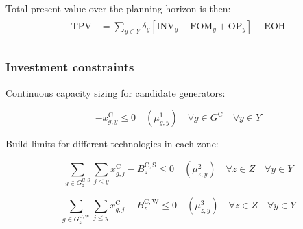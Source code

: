 \documentclass{article}
\newcommand{\sGeneratorsCandidate}{G^{\mathrm{C}}}
\newcommand{\sGeneratorsCandidateWind}{G^{\mathrm{C,W}}}
\newcommand{\sGeneratorsCandidateSolar}{G^{\mathrm{C,S}}}
\newcommand{\sYears}{Y}
\newcommand{\sZones}{Z}
\newcommand{\iGenerator}{g}
\newcommand{\iYear}{y}
\newcommand{\iYearAlias}{j}
\newcommand{\iScenario}{s}
\newcommand{\iZone}{z}
\newcommand{\cOperatingCost}[1][\iYear,\iScenario]{\mathrm{OP}_{#1}}
\newcommand{\cFixedOperationsMaintenanceCost}[1][\iYear]{\mathrm{FOM}_{#1}}
\newcommand{\cInvestmentCost}[1][\iYear]{\mathrm{INV}_{#1}}
\newcommand{\cTotalPresentValue}[1][]{\mathrm{TPV}_{#1}}
\newcommand{\cBuildLimitWind}{B^{\mathrm{C,\mathrm{W}}}_{\iZone}}
\newcommand{\cBuildLimitSolar}{B^{\mathrm{C,\mathrm{S}}}_{\iZone}}
\newcommand{\cDiscountRate}[1][\iYear]{\delta_{#1}}
\newcommand{\vInstalledCapacity}[1][\iGenerator,\iYear]{x^{\mathrm{C}}_{#1}}
\newcommand{\vInstalledCapacityTotal}[1][\iGenerator,\iYear]{a_{#1}}
\newcommand{\cEndOfHorizonCost}{\mathrm{EOH}}
\newcommand{\dNonNegativeCandidateCapacity}[1][\iGenerator,\iYear]{\mu_{#1}^{1}}
\newcommand{\dSolarBuildLimit}[1][\iZone,\iYear]{\mu_{#1}^{2}}
\newcommand{\dWindBuildLimit}[1][\iZone,\iYear]{\mu_{#1}^{3}}
\newcommand{\dTotalInstallCapacity}[1][\iGenerator,\iYear]{\nu_{#1}^{1}}
\begin{document}
Total present value over the planning horizon is then:
\begin{align}
	\begin{split}
		\cTotalPresentValue & = \sum\limits_{\iYear \in \sYears} \cDiscountRate \left[\cInvestmentCost + \cFixedOperationsMaintenanceCost + \cOperatingCost[\iYear] \right] 
		+ \cEndOfHorizonCost \\
	\end{split}
\end{align}

\subsubsection{Investment constraints}
Continuous capacity sizing for candidate generators:

\begin{equation}
	- \vInstalledCapacity[\iGenerator,\iYear] \leq 0 \quad (\dNonNegativeCandidateCapacity) \quad \forall \iGenerator \in \sGeneratorsCandidate \quad \forall \iYear \in \sYears
\end{equation}


Build limits for different technologies in each zone:

\begin{equation}
\sum\limits_{\iGenerator \in \sGeneratorsCandidateSolar_{\iZone}} \sum\limits_{\iYearAlias \leq \iYear} \vInstalledCapacity[\iGenerator,\iYearAlias] - \cBuildLimitSolar \leq 0 \quad (\dSolarBuildLimit) \quad \forall \iZone \in \sZones \quad \forall \iYear \in \sYears
\end{equation}


\begin{equation}
\sum\limits_{\iGenerator \in \sGeneratorsCandidateWind_{\iZone}} \sum\limits_{\iYearAlias \leq \iYear} \vInstalledCapacity[\iGenerator,\iYearAlias] - \cBuildLimitWind \leq 0 \quad (\dWindBuildLimit) \quad \forall \iZone \in \sZones \quad \forall \iYear \in \sYears 
\end{equation}
\end{document}
